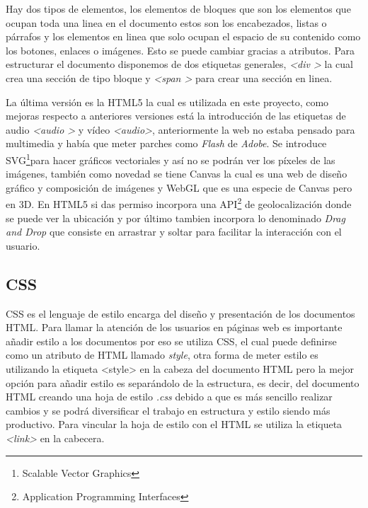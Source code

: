 Hay dos tipos de elementos, los elementos de bloques que son los elementos que ocupan toda una linea en el documento estos son los encabezados, listas o párrafos y los elementos en linea que solo ocupan el espacio de su contenido como los botones, enlaces o imágenes. Esto se puede cambiar gracias a atributos. Para estructurar el documento disponemos de dos etiquetas generales, \textit{\textless div \textgreater} la cual crea una sección de tipo bloque y \textit{\textless span \textgreater} para crear una sección en linea.\cite{juan2}

La última versión es la HTML5 la cual es utilizada en este proyecto, como mejoras respecto a anteriores versiones está la introducción de las etiquetas de audio \textit{\textless audio \textgreater} y vídeo \textit{\textless audio\textgreater}, anteriormente la web no estaba pensado para multimedia y había que meter parches como\textit{ Flash} de \textit{Adobe}. Se introduce SVG\footnote{Scalable Vector Graphics }para hacer gráficos vectoriales y así no se podrán ver los píxeles de las imágenes, también como novedad se tiene Canvas la cual es una web de diseño gráfico y composición de imágenes y WebGL que es una especie de Canvas pero en 3D. En HTML5 si das permiso incorpora una API\footnote{Application Programming Interfaces} de geolocalización donde se puede ver la ubicación y por último tambien incorpora lo denominado \textit{Drag and Drop} que consiste en arrastrar y soltar para facilitar la interacción con el usuario.\\

\newpage
\subsection{CSS}
CSS es el lenguaje de estilo encarga del diseño y presentación de los documentos HTML. Para llamar la atención de los usuarios en páginas web es importante añadir estilo a los documentos por eso se utiliza CSS, el cual puede definirse como un atributo de HTML llamado\textit{ style}, otra forma de meter estilo es utilizando la etiqueta {\textless style\textgreater} en la cabeza del documento HTML pero la mejor opción para añadir estilo es separándolo de la estructura, es decir, del documento HTML creando una hoja de estilo \textit{.css}  debido a que es más sencillo realizar cambios y se podrá diversificar el trabajo en estructura y estilo siendo más productivo. Para vincular la hoja de estilo con el HTML se utiliza la etiqueta \textit{\textless link\textgreater} en la cabecera.\\

